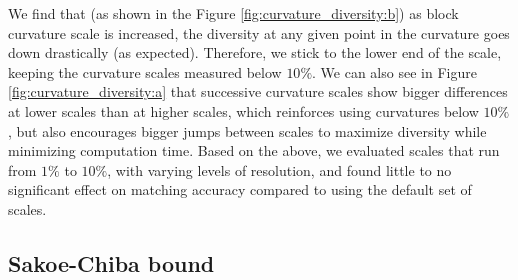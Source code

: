 We find that (as shown in the Figure \ref{fig:curvature_diversity:b}) as block curvature scale is increased, the diversity at any given point in the curvature goes down drastically (as expected). 
Therefore, we stick to the lower end of the scale, keeping the curvature scales measured below $10\%$.
We can also see in Figure \ref{fig:curvature_diversity:a} that successive curvature scales show bigger differences at lower scales than at higher scales, which reinforces using curvatures below $10\%$, but also encourages bigger jumps between scales to maximize diversity while minimizing computation time.
Based on the above, we evaluated scales that run from $1\%$ to $10\%$, with varying levels of resolution, and found little to no significant effect on matching accuracy compared to using the default set of scales.


\subsection{Sakoe-Chiba bound}








